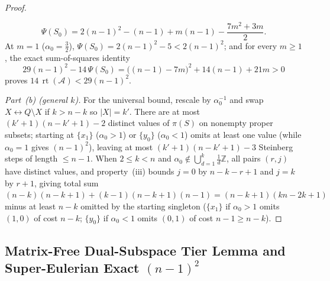\documentclass[11pt,a4paper]{article}
\theoremstyle{definition}
\theoremstyle{remark}
\newcommand{\rt}{\operatorname{rt}}
\newcommand{\Z}{\mathbb{Z}}
\newcommand{\cA}{\mathcal{A}}
\begin{document}
\begin{proof}
\begin{itemize}[nosep]
  \[
    \Psi(S_0) = 2(n - 1)^2 - (n - 1) + m(n - 1) - \frac{7m^2 + 3m}{2}.
  \]
  At $m = 1$ ($\alpha_0 = \frac{3}{2}$), $\Psi(S_0) = 2(n-1)^2 - 5 < 2(n-1)^2$; and for every $m \ge 1$, the exact sum-of-squares identity
  \[
    29(n - 1)^2 - 14\,\Psi(S_0) = \bigl((n - 1) - 7m\bigr)^2 + 14(n - 1) + 21m > 0
  \]
  proves $14\,\rt(\cA) < 29(n - 1)^2$.
\end{itemize}

\emph{Part~(b) (general $k$).} For the universal bound, rescale by $\alpha_0^{-1}$ and swap $X \leftrightarrow Q \setminus X$ if $k > n - k$ so $|X| = k'$. There are at most $(k'+1)(n-k'+1) - 2$ distinct values of $\pi(S)$ on nonempty proper subsets; starting at $\{x_1\}$ ($\alpha_0 > 1$) or $\{y_0\}$ ($\alpha_0 < 1$) omits at least one value (while $\alpha_0 = 1$ gives $(n-1)^2$), leaving at most $(k'+1)(n-k'+1) - 3$ Steinberg steps of length $\le n - 1$. When $2 \le k < n$ and $\alpha_0 \notin \bigcup_{d=1}^k \frac{1}{d}\Z$, all pairs $(r, j)$ have distinct values, and property~(iii) bounds $j = 0$ by $n - k - r + 1$ and $j = k$ by $r + 1$, giving total sum $(n-k)(n-k+1) + (k-1)(n-k+1)(n-1) = (n-k+1)(kn - 2k + 1)$ minus at least $n - k$ omitted by the starting singleton ($\{x_1\}$ if $\alpha_0 > 1$ omits $(1,0)$ of cost $n-k$; $\{y_0\}$ if $\alpha_0 < 1$ omits $(0,1)$ of cost $n-1 \ge n-k$).
\end{proof}

\subsection{Matrix-Free Dual-Subspace Tier Lemma and Super-Eulerian Exact \texorpdfstring{$(n-1)^2$}{(n-1)\textasciicircum 2}}
\end{document}
